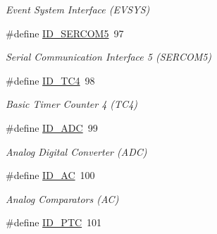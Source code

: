\begin{DoxyCompactItemize}
\begin{DoxyCompactList}\small\item\em Event System Interface (E\+V\+S\+Y\+S) \end{DoxyCompactList}\item 
\hypertarget{group___s_a_m_l21_g18_a__id_ga79c5ce89f89d004cb9987e28937cfdfb}{}\#define \hyperlink{group___s_a_m_l21_g18_a__id_ga79c5ce89f89d004cb9987e28937cfdfb}{I\+D\+\_\+\+S\+E\+R\+C\+O\+M5}~97\label{group___s_a_m_l21_g18_a__id_ga79c5ce89f89d004cb9987e28937cfdfb}

\begin{DoxyCompactList}\small\item\em Serial Communication Interface 5 (S\+E\+R\+C\+O\+M5) \end{DoxyCompactList}\item 
\hypertarget{group___s_a_m_l21_g18_a__id_ga59ecaec462139ce30c8ebe1dc25f9f7d}{}\#define \hyperlink{group___s_a_m_l21_g18_a__id_ga59ecaec462139ce30c8ebe1dc25f9f7d}{I\+D\+\_\+\+T\+C4}~98\label{group___s_a_m_l21_g18_a__id_ga59ecaec462139ce30c8ebe1dc25f9f7d}

\begin{DoxyCompactList}\small\item\em Basic Timer Counter 4 (T\+C4) \end{DoxyCompactList}\item 
\hypertarget{group___s_a_m_l21_g18_a__id_gafb7efa537d1d64419483b97f642009fd}{}\#define \hyperlink{group___s_a_m_l21_g18_a__id_gafb7efa537d1d64419483b97f642009fd}{I\+D\+\_\+\+A\+D\+C}~99\label{group___s_a_m_l21_g18_a__id_gafb7efa537d1d64419483b97f642009fd}

\begin{DoxyCompactList}\small\item\em Analog Digital Converter (A\+D\+C) \end{DoxyCompactList}\item 
\hypertarget{group___s_a_m_l21_g18_a__id_ga20fe08f8d0b2a4e6c0dbb2371aacadb0}{}\#define \hyperlink{group___s_a_m_l21_g18_a__id_ga20fe08f8d0b2a4e6c0dbb2371aacadb0}{I\+D\+\_\+\+A\+C}~100\label{group___s_a_m_l21_g18_a__id_ga20fe08f8d0b2a4e6c0dbb2371aacadb0}

\begin{DoxyCompactList}\small\item\em Analog Comparators (A\+C) \end{DoxyCompactList}\item 
\hypertarget{group___s_a_m_l21_g18_a__id_ga6ce249818b3ff70438a4eff92e49d38e}{}\#define \hyperlink{group___s_a_m_l21_g18_a__id_ga6ce249818b3ff70438a4eff92e49d38e}{I\+D\+\_\+\+P\+T\+C}~101\label{group___s_a_m_l21_g18_a__id_ga6ce249818b3ff70438a4eff92e49d38e}


\end{DoxyCompactItemize}
